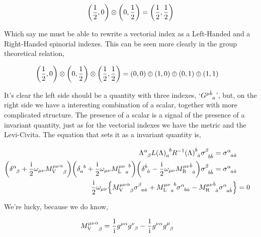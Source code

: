 \begin{align}
    \qty(\frac12,0)\otimes\qty(0,\frac12)=\qty(\frac12,\frac12)\nonumber
\end{align}

Which say me must be able to rewrite a vectorial index as a Left-Handed and a Right-Handed spinorial indexes. This can be seen more clearly in the group theoretical relation,

\begin{align}
    \qty(\frac12,0)\otimes\qty(0,\frac12)\otimes\qty(\frac12,\frac12)&=\qty(0,0)\oplus\qty(1,0)\oplus\qty(0,1)\oplus\qty(1,1)\nonumber
\end{align}

It's clear the left side should be a quantity with three indexes, `$\tensor{G}{^\mu^{\dot b}_a}$', but, on the right side we have a interesting combination of a scalar, together with more complicated structure. The presence of a scalar is a signal of the presence of a invariant quantity, just as for the vectorial indexes we have the metric and the Levi-Civita. The equation that sets it as a invariant quantity is,

\begin{align}
    \tensor{\Lambda}{^\alpha_\beta}\tensor{L\qty(\Lambda)}{_a^b}\tensor{{R^{-1}}\qty(\Lambda)}{^{\dot b}_{\dot a}}\tensor{\sigma}{^\beta_b_{\dot b}}=\tensor{\sigma}{^\alpha_a_{\dot a}}\nonumber\\
    \qty(\tensor{\delta}{^\alpha_\beta}+\frac\im2\omega_{\mu\nu}\tensor{{{M_{\textnormal V}^{\mu\nu}}}}{^\alpha_\beta})\qty(\tensor{\delta}{_a^b}+\frac\im2\omega_{\mu\nu}\tensor{{{M_{\textnormal L}^{\mu\nu}}}}{_a^b})\qty(\tensor{\delta}{^{\dot b}_{\dot a}}-\frac\im2\omega_{\mu\nu}\tensor{{{M_{\textnormal R}^{\mu\nu}}}}{^{\dot b}_{\dot a}})\tensor{\sigma}{^\beta_b_{\dot b}}=\tensor{\sigma}{^\alpha_a_{\dot a}}\nonumber\\
    \frac\im2\omega_{\mu\nu}\qty{\tensor{{{M_{\textnormal V}^{\mu\nu}}}}{^\alpha_\beta}\tensor{\sigma}{^\beta_a_{\dot a}}+\tensor{{{M_{\textnormal L}^{\mu\nu}}}}{_a^b}\tensor{\sigma}{^\alpha_b_{\dot a}}-\tensor{{{M_{\textnormal R}^{\mu\nu}}}}{^{\dot b}_{\dot a}}\tensor{\sigma}{^\alpha_a_{\dot b}}}&=0\nonumber
\end{align}

We're lucky, because we do know,

\begin{align}
    \tensor{{{M_{\textnormal V}^{\mu\nu}}}}{^\alpha_\beta}&=\frac1\im g^{\mu\alpha}\tensor{g}{^\nu_\beta}-\frac1\im g^{\nu\alpha}\tensor{g}{^\mu_\beta}\nonumber
\end{align}

